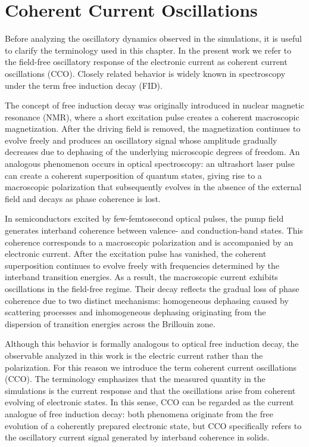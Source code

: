 \chapter{Coherent Current Oscillations}
\label{chap:cco}



Before analyzing the oscillatory dynamics observed in the simulations, it is useful to clarify the terminology used in this chapter. In the present work we refer to the field-free oscillatory response of the electronic current as coherent current oscillations (CCO). Closely related behavior is widely known in spectroscopy under the term free induction decay (FID).

The concept of free induction decay was originally introduced in nuclear magnetic resonance (NMR), where a short excitation pulse creates a coherent macroscopic magnetization. After the driving field is removed, the magnetization continues to evolve freely and produces an oscillatory signal whose amplitude gradually decreases due to dephasing of the underlying microscopic degrees of freedom. An analogous phenomenon occurs in optical spectroscopy: an ultrashort laser pulse can create a coherent superposition of quantum states, giving rise to a macroscopic polarization that subsequently evolves in the absence of the external field and decays as phase coherence is lost.

In semiconductors excited by few-femtosecond optical pulses, the pump field generates interband coherence between valence- and conduction-band states. This coherence corresponds to a macroscopic polarization and is accompanied by an electronic current. After the excitation pulse has vanished, the coherent superposition continues to evolve freely with frequencies determined by the interband transition energies. As a result, the macroscopic current exhibits oscillations in the field-free regime. Their decay reflects the gradual loss of phase coherence due to two distinct mechanisms: homogeneous dephasing caused by scattering processes and inhomogeneous dephasing originating from the dispersion of transition energies across the Brillouin zone.

Although this behavior is formally analogous to optical free induction decay, the observable analyzed in this work is the electric current rather than the polarization. For this reason we introduce the term coherent current oscillations (CCO). The terminology emphasizes that the measured quantity in the simulations is the current response and that the oscillations arise from coherent evolving of electronic states. In this sense, CCO can be regarded as the current analogue of free induction decay: both phenomena originate from the free evolution of a coherently prepared electronic state, but CCO specifically refers to the oscillatory current signal generated by interband coherence in solids.

